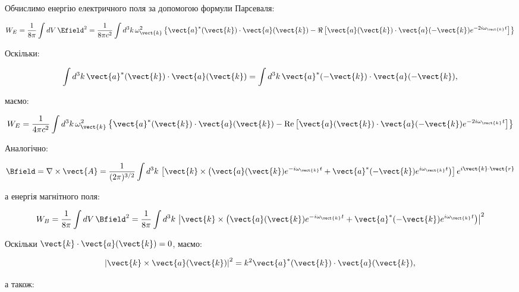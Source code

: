 Обчислимо енергію електричного поля за допомогою формули Парсеваля:

\begin{equation}
W_E = \frac{1}{8\pi} \int dV \, \Efield^2 = \frac{1}{8\pi c^2} \int d^3k \, \omega_{\vect{k}}^2 \left\{ \vect{a}^*(\vect{k}) \cdot \vect{a}(\vect{k}) -
\Re \left[ \vect{a}(\vect{k}) \cdot \vect{a}(-\vect{k}) e^{-2i\omega_{\vect{k}} t} \right] \right\}
\label{eq:W_E}
\end{equation}

Оскільки:

\begin{equation*}
\int d^3k \, \vect{a}^*(\vect{k}) \cdot \vect{a}(\vect{k}) = \int d^3k \, \vect{a}^*(-\vect{k}) \cdot \vect{a}(-\vect{k}),
\end{equation*}

маємо:

\begin{equation}
W_E = \frac{1}{4\pi c^2} \int d^3k \, \omega_{\vect{k}}^2 \left\{ \vect{a}^*(\vect{k}) \cdot \vect{a}(\vect{k}) - \text{Re} \left[ \vect{a}(\vect{k})
\cdot \vect{a}(-\vect{k}) e^{-2i\omega_{\vect{k}} t} \right] \right\}
\label{eq:W_E_final}
\end{equation}

Аналогічно:

\begin{equation}
\Bfield = \nabla \times \vect{A} = \frac{1}{(2\pi)^{3/2}} \int d^3k \, \left[ \vect{k} \times \left( \vect{a}(\vect{k}) e^{-i\omega_{\vect{k}} t} +
\vect{a}^*(-\vect{k}) e^{i\omega_{\vect{k}} t} \right) \right] e^{i\vect{k} \cdot \vect{r}}
\label{eq:B_field_fourier}
\end{equation}

а енергія магнітного поля:

\begin{equation}
W_B = \frac{1}{8\pi} \int dV \, \Bfield^2 = \frac{1}{8\pi} \int d^3k \, \left| \vect{k} \times \left( \vect{a}(\vect{k}) e^{-i\omega_{\vect{k}} t} +
\vect{a}^*(-\vect{k}) e^{i\omega_{\vect{k}} t} \right) \right|^2
\label{eq:W_B}
\end{equation}

Оскільки \(\vect{k} \cdot \vect{a}(\vect{k}) = 0\), маємо:

\begin{equation*}
\left| \vect{k} \times \vect{a}(\vect{k}) \right|^2 = k^2 \vect{a}^*(\vect{k}) \cdot \vect{a}(\vect{k}),
\end{equation*}

а також:

